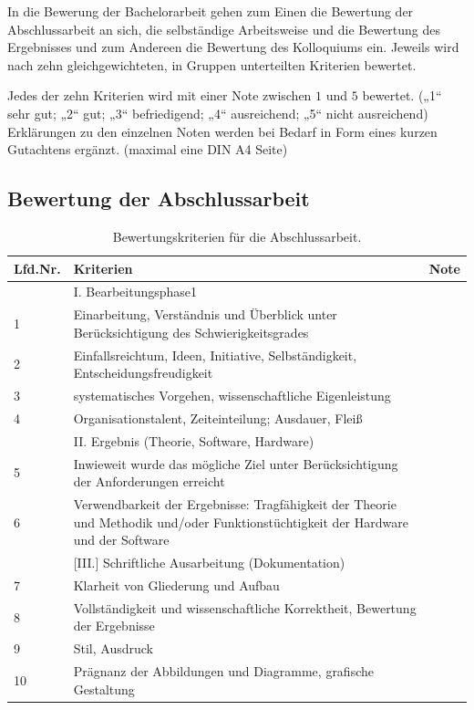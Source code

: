 

In die Bewerung der Bachelorarbeit gehen zum Einen die Bewertung der  Abschlussarbeit an sich, die selbständige Arbeitsweise und die Bewertung des Ergebnisses und zum Andereen die Bewertung des Kolloquiums ein. Jeweils wird nach zehn gleichgewichteten, in Gruppen unterteilten Kriterien bewertet.



Jedes der zehn Kriterien wird mit einer Note zwischen $1$ und $5$ bewertet. („1“ sehr gut; „2“ gut; „3“ befriedigend; „4“ ausreichend; „5“ nicht ausreichend)  Erklärungen zu den einzelnen Noten werden bei Bedarf in Form eines kurzen Gutachtens ergänzt. (maximal eine DIN A4 Seite)

\subsection{Bewertung der Abschlussarbeit}

\begin{table}[!h]
\centering
\begin{tabular}{ |p{1cm}|p{9cm}|p{0.7cm}|  }
\hline
Lfd.Nr. &Kriterien  &Note\\  
\hline
\hline
&I. Bearbeitungsphase1&\\
\hline
1&Einarbeitung, Verständnis und Überblick unter Berücksichtigung des Schwierigkeitsgrades&\\
\hline
2& Einfallsreichtum, Ideen, Initiative, Selbständigkeit, Entscheidungsfreudigkeit&\\
\hline
3& systematisches Vorgehen, wissenschaftliche Eigenleistung&\\
\hline
4&Organisationstalent, Zeiteinteilung; Ausdauer, Fleiß&\\
\hline
& II. Ergebnis (Theorie, Software, Hardware)&\\ 
\hline
5&Inwieweit wurde das mögliche Ziel unter Berücksichtigung der Anforderungen erreicht&\\
\hline
6&Verwendbarkeit der Ergebnisse: Tragfähigkeit der Theorie und Methodik und/oder Funktionstüchtigkeit der Hardware und der Software&\\
\hline
&[III.] Schriftliche Ausarbeitung (Dokumentation)&\\
\hline
7&Klarheit von Gliederung und Aufbau&\\
\hline
8&Vollständigkeit und wissenschaftliche Korrektheit, Bewertung der Ergebnisse&\\
\hline
9&Stil, Ausdruck&\\\hline
10&Prägnanz der Abbildungen und Diagramme, grafische Gestaltung&\\
\hline
\end{tabular}
\caption{Bewertungskriterien für die Abschlussarbeit.}
\label{tab:arbeit}
\end{table}

